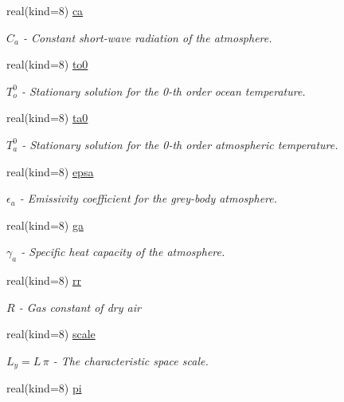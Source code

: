 \begin{DoxyCompactItemize}
real(kind=8) \hyperlink{namespaceparams_a39788da6872d45cd235d734a6f60ac20}{ca}
\begin{DoxyCompactList}\small\item\em $C_a$ -\/ Constant short-\/wave radiation of the atmosphere. \end{DoxyCompactList}\item 
real(kind=8) \hyperlink{namespaceparams_ad880ab6d5fab6c7a095b526383e75404}{to0}
\begin{DoxyCompactList}\small\item\em $T_o^0$ -\/ Stationary solution for the 0-\/th order ocean temperature. \end{DoxyCompactList}\item 
real(kind=8) \hyperlink{namespaceparams_af3fdd8c130a667bca95de5ebf9e5f492}{ta0}
\begin{DoxyCompactList}\small\item\em $T_a^0$ -\/ Stationary solution for the 0-\/th order atmospheric temperature. \end{DoxyCompactList}\item 
real(kind=8) \hyperlink{namespaceparams_a10c96506a7d395bb9b15734461aef879}{epsa}
\begin{DoxyCompactList}\small\item\em $\epsilon_a$ -\/ Emissivity coefficient for the grey-\/body atmosphere. \end{DoxyCompactList}\item 
real(kind=8) \hyperlink{namespaceparams_a1c769c8719a62f1a72837b7b9daf8024}{ga}
\begin{DoxyCompactList}\small\item\em $\gamma_a$ -\/ Specific heat capacity of the atmosphere. \end{DoxyCompactList}\item 
real(kind=8) \hyperlink{namespaceparams_ac1c1ed1ab5fcbdbd6a77b8a5c69fc6e5}{rr}
\begin{DoxyCompactList}\small\item\em $R$ -\/ Gas constant of dry air \end{DoxyCompactList}\item 
real(kind=8) \hyperlink{namespaceparams_a7803126847c2e1b2b4aced941ec9257b}{scale}
\begin{DoxyCompactList}\small\item\em $L_y = L \, \pi$ -\/ The characteristic space scale. \end{DoxyCompactList}\item 
real(kind=8) \hyperlink{namespaceparams_aaed8cf35d6e94ec5a9aeab80125e470f}{pi}

\end{DoxyCompactItemize}
